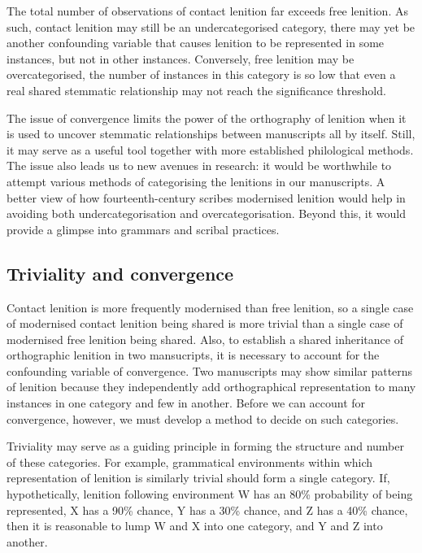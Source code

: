 The total number of observations of contact lenition far exceeds free lenition. As such, contact lenition may still be an undercategorised category, \ie there may yet be another confounding variable that causes lenition to be represented in some instances, but not in other instances. Conversely, free lenition may be overcategorised, \ie the number of instances in this category is so low that even a real shared stemmatic relationship may not reach the significance threshold. 

The issue of convergence  limits the power of the orthography of lenition when it is used to uncover stemmatic relationships between manuscripts all by itself. Still, it may serve as a useful tool together with more established philological methods. The issue also leads us to new avenues in research: it would be worthwhile to attempt various methods of categorising the lenitions in our manuscripts. A better view of how fourteenth-century scribes modernised lenition would help in avoiding both undercategorisation and overcategorisation. Beyond this, it would provide a glimpse into  grammars and scribal practices.

\subsection{Triviality and convergence}
\label{sec:triv-conv}

Contact lenition is more frequently modernised than free lenition, so a single case of modernised contact lenition being shared is more trivial than a single case of modernised free lenition being shared. 
Also, to establish a shared inheritance of orthographic lenition in two mansucripts,  it is necessary to account for the confounding variable of convergence. Two manuscripts may show similar patterns of lenition because they independently add orthographical representation to many instances in one category and few in another. Before we can account for convergence, however, we must develop a method to decide on such categories.

Triviality may serve as a guiding principle in forming the structure and number of these categories. For example, grammatical environments within which representation of lenition is similarly trivial should form a single category. If, hypothetically, lenition following environment W has an 80\% probability of being represented, X has a 90\% chance, Y has a 30\% chance, and Z has a 40\% chance, then it is reasonable to lump W and X into one category, and Y and Z into another.

